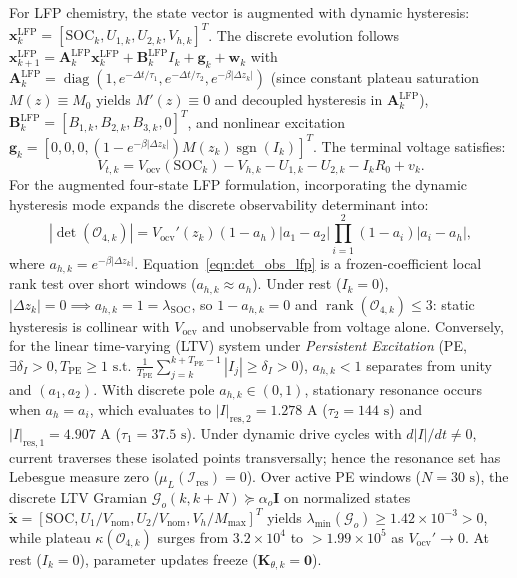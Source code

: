 \documentclass[balance,nocopyright,upint,varvw,hyphenate,barcolor=NavyBlue,nolists]{asmejour}
\begin{document}
For LFP chemistry, the state vector is augmented with dynamic hysteresis: $\mathbf{x}_k^{\text{LFP}} = [\text{SOC}_k, U_{1,k}, U_{2,k}, V_{h,k}]^T$. The discrete evolution follows $\mathbf{x}_{k+1}^{\text{LFP}} = \mathbf{A}_k^{\text{LFP}} \mathbf{x}_k^{\text{LFP}} + \mathbf{B}_k^{\text{LFP}} I_k + \mathbf{g}_k + \mathbf{w}_k$ with $\mathbf{A}_k^{\text{LFP}} = \operatorname{diag}(1, e^{-\Delta t/\tau_1}, e^{-\Delta t/\tau_2}, e^{-\beta|\Delta z_k|})$ (since constant plateau saturation $M(z) \equiv M_0$ yields $M'(z) \equiv 0$ and decoupled hysteresis in $\mathbf{A}_k^{\text{LFP}}$), $\mathbf{B}_k^{\text{LFP}} = [B_{1,k}, B_{2,k}, B_{3,k}, 0]^T$, and nonlinear excitation $\mathbf{g}_k = [0, 0, 0, (1 - e^{-\beta |\Delta z_k|}) M(z_k) \operatorname{sgn}(I_k)]^T$. The terminal voltage satisfies:
\begin{equation}\label{eqn:vt_lfp}
V_{t,k} = V_{\text{ocv}}(\text{SOC}_k) - V_{h,k} - U_{1,k} - U_{2,k} - I_k R_0 + v_k.
\end{equation}
For the augmented four-state LFP formulation, incorporating the dynamic hysteresis mode expands the discrete observability determinant into:
\begin{equation}\label{eqn:det_obs_lfp}
|\det(\mathcal{O}_{4,k})| = V_{\text{ocv}}'(z_k)(1 - a_h)|a_1 - a_2|\prod_{i=1}^2 (1 - a_i)|a_i - a_h|,
\end{equation}
where $a_{h,k} = e^{-\beta |\Delta z_k|}$. Equation~\eqref{eqn:det_obs_lfp} is a frozen-coefficient local rank test over short windows ($a_{h,k} \approx a_h$). Under rest ($I_k = 0$), $|\Delta z_k| = 0 \implies a_{h,k} = 1 = \lambda_{\text{SOC}}$, so $1 - a_{h,k} = 0$ and $\operatorname{rank}(\mathcal{O}_{4,k}) \le 3$: static hysteresis is collinear with $V_{\text{ocv}}$ and unobservable from voltage alone. Conversely, for the linear time-varying (LTV) system under \emph{Persistent Excitation} (PE, $\exists \delta_I > 0, T_{\text{PE}} \ge 1 \text{ s.t. } \frac{1}{T_{\text{PE}}} \sum_{j=k}^{k+T_{\text{PE}}-1} |I_j| \ge \delta_I > 0$), $a_{h,k} < 1$ separates from unity and $(a_1, a_2)$. With discrete pole $a_{h,k} \in (0, 1)$, stationary resonance occurs when $a_{h} = a_i$, which evaluates to $|I|_{\text{res},2} = 1.278\text{ A}$ ($\tau_2 = 144\text{ s}$) and $|I|_{\text{res},1} = 4.907\text{ A}$ ($\tau_1 = 37.5\text{ s}$). Under dynamic drive cycles with $d|I|/dt \ne 0$, current traverses these isolated points transversally; hence the resonance set has Lebesgue measure zero ($\mu_L(\mathcal{I}_{\text{res}}) = 0$). Over active PE windows ($N = 30\text{ s}$), the discrete LTV Gramian $\mathcal{G}_o(k, k+N) \succeq \alpha_o \mathbf{I}$ on normalized states $\tilde{\mathbf{x}} = [\text{SOC}, U_1/V_{\text{nom}}, U_2/V_{\text{nom}}, V_h/M_{\max}]^T$ yields $\lambda_{\min}(\mathcal{G}_o) \ge 1.42 \times 10^{-3} > 0$, while plateau $\kappa(\mathcal{O}_{4,k})$ surges from $3.2 \times 10^4$ to $>1.99 \times 10^5$ as $V_{\text{ocv}}' \to 0$. At rest ($I_k = 0$), parameter updates freeze ($\mathbf{K}_{\theta,k} = \mathbf{0}$).
\end{document}
